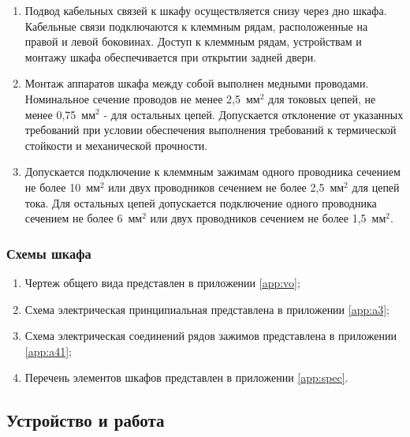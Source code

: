 \begin{enumerate}[label=\arabic{section}.\arabic{subsection}.\arabic{subsubsection}.\arabic*, align=left, labelsep=4pt, leftmargin=0pt, itemindent=2cm]
Крепление интеллектуального электронного устройства предусмотрено на DIN-рейках внутри шкафа.

\item
Подвод кабельных связей к шкафу осуществляется снизу через дно шкафа.
Кабельные связи подключаются к клеммным рядам, расположенные на правой и левой боковинах.
Доступ к клеммным рядам, устройствам и монтажу шкафа обеспечивается при открытии задней двери. 

\item
Монтаж аппаратов шкафа между собой выполнен медными проводами.
Номинальное сечение проводов не менее 2,5~мм$^2$ для токовых цепей, не менее 0,75~мм$^2$ - для остальных цепей.
Допускается отклонение от указанных требований при условии обеспечения выполнения требований к термической стойкости и механической прочности.

\item
Допускается подключение к клеммным зажимам одного проводника сечением не более 10~мм$^2$ или двух проводников сечением не более 2,5~мм$^2$ для цепей тока.
Для остальных цепей допускается подключение одного проводника сечением не более 6~мм$^2$ или двух проводников сечением не более 1,5~мм$^2$.

\end{enumerate}

\subsubsection{Схемы шкафа}
\begin{enumerate}[label=\arabic{section}.\arabic{subsection}.\arabic{subsubsection}.\arabic*, align=left, labelsep=4pt, leftmargin=0pt, itemindent=2cm]
\item Чертеж общего вида представлен в приложении \ref{app:vo};
\item Схема электрическая принципиальная представлена в приложении \ref{app:a3};
\item Схема электрическая соединений рядов зажимов представлена в приложении \ref{app:a41};
\item Перечень элементов шкафов представлен в приложении \ref{app:spec}.
\end{enumerate}


\color{unidarkgreen}\subsection{Устройство и работа}\color{black}

